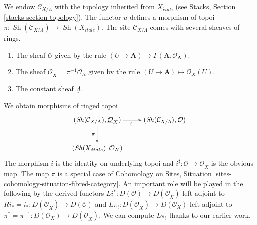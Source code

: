 \documentclass{stacks-project}
\theoremstyle{plain}
\theoremstyle{definition}
\theoremstyle{remark}
\numberwithin{equation}{subsection}
\def\Sh{\mathop{\mathit{Sh}}\nolimits}
\def\etale{{\acute{e}tale}}
\begin{document}
\noindent
We endow $\mathcal{C}_{X/\Lambda}$ with the topology inherited from
$X_\etale$ (see Stacks, Section \ref{stacks-section-topology}).
The functor $u$ defines a morphism of topoi
$\pi : \Sh(\mathcal{C}_{X/\Lambda}) \to \Sh(X_\etale)$.
The site $\mathcal{C}_{X/\Lambda}$ comes with several sheaves of rings.
\begin{enumerate}
\item The sheaf $\mathcal{O}$ given by the rule
$(U \to \mathbf{A}) \mapsto \Gamma(\mathbf{A}, \mathcal{O}_\mathbf{A})$.
\item The sheaf $\underline{\mathcal{O}}_X = \pi^{-1}\mathcal{O}_X$ given by
the rule $(U \to \mathbf{A}) \mapsto \mathcal{O}_X(U)$.
\item The constant sheaf $\underline{\Lambda}$.
\end{enumerate}
We obtain morphisms of ringed topoi
\begin{equation}
\label{equation-pi-spaces}
\vcenter{
\xymatrix{
(\Sh(\mathcal{C}_{X/\Lambda}), \underline{\mathcal{O}}_X) \ar[r]_i \ar[d]_\pi &
(\Sh(\mathcal{C}_{X/\Lambda}), \mathcal{O}) \\
(\Sh(X_\etale), \mathcal{O}_X)
}
}
\end{equation}
The morphism $i$ is the identity on underlying topoi and
$i^\sharp : \mathcal{O} \to \underline{\mathcal{O}}_X$
is the obvious map.
The map $\pi$ is a special case of Cohomology on Sites, Situation
\ref{sites-cohomology-situation-fibred-category}.
An important role will be played in the following
by the derived functors
$
Li^* : D(\mathcal{O}) \longrightarrow D(\underline{\mathcal{O}}_X)
$
left adjoint to $Ri_* = i_* : D(\underline{\mathcal{O}}_X) \to D(\mathcal{O})$
and
$
L\pi_! : D(\underline{\mathcal{O}}_X) \longrightarrow D(\mathcal{O}_X)
$
left adjoint to
$\pi^* = \pi^{-1} : D(\mathcal{O}_X) \to D(\underline{\mathcal{O}}_X)$.
We can compute $L\pi_!$ thanks to our earlier work.
\end{document}
